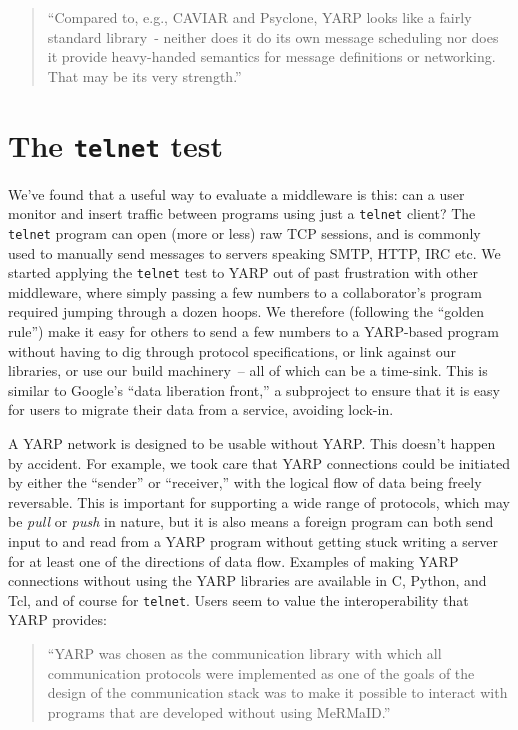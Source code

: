\documentclass[letterpaper]{article}
\begin{document}
\begin{quote}
``Compared to, e.g., CAVIAR and Psyclone, YARP
looks like a fairly standard library~- neither does it
do its own message scheduling nor does it provide
heavy-handed semantics for message definitions or
networking. That may be its very strength.'' \cite{stefansson09yarp}
\end{quote}


\section{The {\tt telnet} test}

We've found that a useful way to evaluate a middleware is
this: can a user monitor and insert traffic between programs using just a
{\tt telnet} client?  The {\tt telnet} program can open (more or less)
raw TCP sessions, and is commonly used to manually send messages to
servers speaking SMTP, HTTP, IRC etc.  
We started applying the {\tt telnet} test to YARP out of past frustration with other
middleware, where simply passing a few numbers to a collaborator's
program required jumping through a dozen hoops.  We therefore
(following the ``golden rule'') make it easy for others
to send a few numbers to a YARP-based program without having to dig
through protocol specifications, or link against our libraries, or use
our build machinery~-- all of which can be a time-sink.
This is similar to Google's ``data liberation front,''
a subproject to ensure that it is easy for users to migrate
their data from a service, avoiding
lock-in.

A YARP network is designed to be usable without YARP.  This doesn't
happen by accident.  
For example, we took care that YARP
connections could be initiated by either the ``sender'' or ``receiver,''
with the logical flow of data being freely reversable.  This is
important for supporting a wide range of protocols, which may be {\it
  pull} or {\it push} in nature, but it is also means a foreign
program can both send input to and read from a YARP program without
getting stuck writing a server for at least
one of the directions of data flow.
Examples of making YARP connections without using the YARP libraries are
available in C, Python, and Tcl, and of course for {\tt telnet}.
Users seem to value the interoperability that YARP provides:

\begin{quote}
``YARP was chosen as the communication library with
which all communication protocols were implemented as
one of the goals of the design of the communication stack
was to make it possible to interact with programs that are
developed without using MeRMaID.'' \cite{barbosa09mermaid}
\end{quote}
\end{document}
